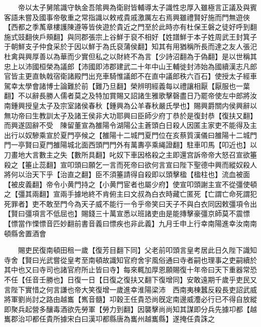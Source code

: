 　　帝以太子舅隂識守執金吾隂興為衛尉皆輔導太子識性忠厚入雖極言正議及與賓客語未嘗及國事帝敬重之常指識以敕戒貴戚激厲左右焉興雖禮賢好施而門無遊俠【西都之季萭章樓護陳遵等皆俠遊於貴近之門至於此時亦有杜保王磐之徒好呼到翻施式豉翻俠戶頰翻】與同郡張宗上谷鮮于裒不相好【姓譜鮮于本子姓周武王封箕子于朝鮮支子仲食采於于因以鮮于為氏裒蒲侯翻】知其有用猶稱所長而達之友人張汜杜禽與興厚善以為華而少實但私之以財終不為言【少詩沼翻為于偽翻】是以世稱其忠上以沛國桓榮為議郎【沛國即沛郡建武二十年中山王輔徙封沛始為國續漢志凡郎官皆主更直執戟宿衛諸殿門出充車騎惟議郎不在直中議郎秩六百石】使授太子經車駕幸太學會諸博士論難於前【難乃旦翻】榮辨明經義每以禮讓相厭【厭服也一葉翻】不以辭長勝人儒者莫之及特加賞賜又詔諸生雅歌擊磬盡日乃罷帝使左中郎將汝南鍾興授皇太子及宗室諸侯春秋【鍾興為公羊春秋嚴氏學也】賜興爵關内侯興辭以無功帝曰生教訓太子及諸王侯非大功耶興曰臣師少府丁恭於是復封恭【復扶又翻】而興遂固辭不受　陳留董宣為雒陽令湖陽公主蒼頭白日殺人因匿主家吏不能得及主出行以奴驂乘宣於夏門亭候之【雒陽十二城門夏門位在亥蔡質漢儀曰雒陽十二城門門一亭賢曰夏門雒陽城北面西頭門門外有萬夀亭乘䋲證翻】駐車叩馬【叩近也】以刀畫地大言數主之失【數所具翻】叱奴下車因格殺之主即還宫訴帝帝大怒召宣欲箠殺之【箠止蕊翻】宣叩頭曰願乞一言而死帝曰欲何言宣曰陛下聖德中興而縱奴殺人將何以治天下乎【治直之翻】臣不須箠請得自殺即以頭擊楹【楹柱也】流血被面【被皮義翻】帝令小黄門持之【小黄門宦者也屬少府】使宣叩頭謝主宣不從彊使頓之【彊其兩翻】宣兩手據地終不肯俯主曰文叔為白衣時藏亡匿死【亡謂亡命死謂犯死罪者】吏不敢至門今為天子威不能行一令乎帝笑曰天子不與白衣同因敕彊項令出【賢曰彊項言不低屈也】賜錢三十萬宣悉以班諸吏由是能摶擊豪彊京師莫不震慓【慓當作慄慓音匹妙翻前書音義曰慓疾也非此義】九月壬申上行幸南陽進幸汝南南頓縣舍置酒會

　　賜吏民復南頓田租一歲【復芳目翻下同】父老前叩頭言皇考居此日久陛下識知寺舍【賢曰光武嘗從皇考至南頓故識知官府舍宇風俗通曰寺者嗣也理事之吏嗣續於其中也又曰寺司也諸官府所止皆曰寺】每來輒加厚恩願賜復十年帝曰天下重器常恐不任【任音壬勝也】日復一日【日復之復扶又翻下復增同】安敢遠期千歲乎吏民又言陛下實惜之何言謙也帝大笑復增一歲進幸淮陽梁沛　西南夷棟蠶反殺長吏詔武威將軍劉尚討之路由越巂【嶲音髓】卭穀王任貴恐尚旣定南邊威灋必行已不得自放縱即聚兵起營多釀毒酒欲先勞軍【勞力到翻】因襲擊尚尚知其謀即分兵先據卭都【越巂郡治卭都任貴所據宋白曰漢卭都縣唐為巂州越巂縣】遂掩任貴誅之

